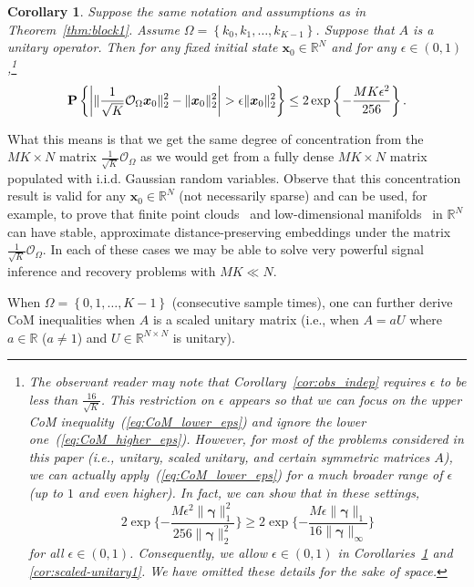 \documentclass[11pt,draftcls,onecolumn]{IEEEtran}
\def\real    { \mathbb{R} }
\newtheorem{cor}{Corollary}
\newcommand{\eps}{\epsilon}
\newcommand{\Prob}[1]{{\bf P}\left\{#1\right\}}
\def \ok {{\mathcal{O}_{\Omega}}}
\newcommand{\vc}[1]{\boldsymbol{#1}}
\def\real    { \mathbb{R} }
\begin{document}
\begin{cor} Suppose the same notation and assumptions as in Theorem~\ref{thm:block1}. Assume $\Omega = \left\{k_0, k_1, \dots, k_{K-1}\right\}$.
Suppose that $A$ is a unitary operator. Then for any fixed initial state $\vc{x}_0 \in \real^N$ and for any $\eps \in (0,1)$,\footnote{The observant reader may note that Corollary~\ref{cor:obs_indep} requires $\epsilon$ to be less than $\frac{16}{\sqrt{K}}$. This restriction on $\epsilon$ appears so that we can focus on the upper \ac{CoM} inequality~(\ref{eq:CoM_lower_eps}) and ignore the lower one~(\ref{eq:CoM_higher_eps}). 
However, for most of the problems considered in this paper (i.e., unitary, scaled unitary, and certain symmetric matrices $A$), we can actually apply~(\ref{eq:CoM_lower_eps}) for a much broader range of $\epsilon$ (up 
to $1$ and even higher). In fact, we can show that in these settings,
\[
2\exp\{-\frac{M\epsilon^{2}\|\vc{\gamma}\|_{1}^{2}}{256\|\vc{\gamma}\|_{2}^{2}}\} \geq 2\exp\{-\frac{M\epsilon\|\vc{\gamma}\|_{1}}{16\|\vc{\gamma}\|_{\infty}}\}
\]
for all $\epsilon \in (0,1)$. Consequently, we allow $\epsilon \in (0,1)$ in Corollaries~\ref{cor:unitary1} and \ref{cor:scaled-unitary1}. We have omitted these details for the sake of space.} 
\begin{equation}
\Prob{\bigg{|}\|\frac{1}{\sqrt{K}}\ok \vc{x}_0 \|_{2}^{2}- \|\vc{x}_0\|_2^2\bigg{|} > \epsilon  \|\vc{x}_0\|_{2}^{2}}
\leq 2\exp\left\{-\frac{M K \epsilon^{2}}{256}\right\}.
\label{eq:conc3}
\end{equation}
\label{cor:unitary1}
\end{cor}

What this means is that we get the same degree of concentration from the $MK \times N$ matrix $\frac{1}{\sqrt{K}}\ok$ as we would get from a
fully dense $MK \times N$ matrix populated with \ac{i.i.d.} Gaussian random variables.
Observe that this concentration result is valid for any
$\vc{x}_0 \in \real^N$ (not necessarily sparse) and can be used, for example, to prove that finite point clouds~\cite{indyk1998approximate} and low-dimensional manifolds~\cite{mbwFocm} in $\real^N$ can have stable, approximate distance-preserving embeddings under the matrix $\frac{1}{\sqrt{K}}\ok$. In each of these cases we may be able to solve very powerful signal inference and recovery problems with $MK \ll N$.

When $\Omega = \left\{0, 1, \dots, K-1\right\}$ (consecutive sample times), one can further derive \ac{CoM} inequalities when $A$ is a scaled unitary matrix (i.e., when $A = aU$ where $a \in \real$ ($a \neq 1$) and $U \in \real^{N \times N}$ is unitary).
\end{document}
